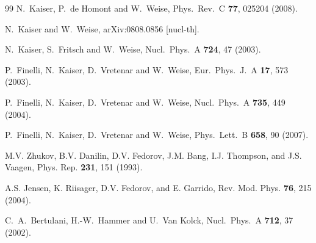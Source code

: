 \documentclass[aps,rmp,nofootinbib,twocolumn,floatfix]{revtex4}
\begin{document}
\begin{thebibliography}{99}
  N.~Kaiser, P.~de Homont and W.~Weise,
  Phys.\ Rev.\  C {\bf 77}, 025204 (2008).

  N.~Kaiser and W.~Weise,
  arXiv:0808.0856 [nucl-th].

  N.~Kaiser, S.~Fritsch and W.~Weise,
  Nucl.\ Phys.\  A {\bf 724}, 47 (2003).

  P.~Finelli, N.~Kaiser, D.~Vretenar and W.~Weise,
  Eur.\ Phys.\ J.\  A {\bf 17}, 573 (2003).

  P.~Finelli, N.~Kaiser, D.~Vretenar and W.~Weise,
  Nucl.\ Phys.\  A {\bf 735}, 449 (2004).

  P.~Finelli, N.~Kaiser, D.~Vretenar and W.~Weise,
  Phys.\ Lett.\  B {\bf 658}, 90 (2007).



M.V. Zhukov, B.V. Danilin, D.V. Fedorov, J.M. Bang, I.J. Thompson, 
and J.S. Vaagen, 
Phys. Rep. {\bf 231}, 151 (1993).

A.S. Jensen, K. Riisager, D.V. Fedorov, and E. Garrido, 
Rev. Mod. Phys. {\bf 76}, 215 (2004).

  C.~A.~Bertulani, H.-W.~Hammer and U.~Van Kolck, 
  Nucl.\ Phys.\  A {\bf 712}, 37 (2002).
 

\end{thebibliography}
\end{document}
